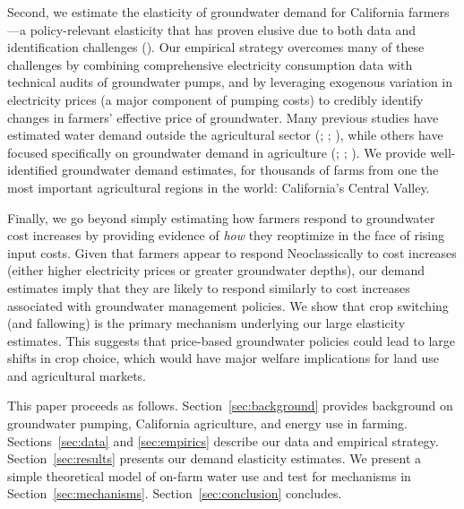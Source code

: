 Second, we estimate the elasticity of groundwater demand for California farmers---a policy-relevant elasticity that has proven elusive due to both data and identification challenges (\textcite{mieno2017}). Our empirical strategy overcomes many of these challenges by combining comprehensive electricity consumption data with technical audits of groundwater pumps, and by leveraging exogenous variation in electricity prices (a major component of pumping costs) to credibly identify changes in farmers' effective price of groundwater. 
Many previous studies have estimated water demand outside the agricultural sector (\textcite{hewitt1995}; \textcite{renwick2000}; \textcite{olmstead2007}), while others have focused specifically on groundwater demand in agriculture (\textcite{hendricks2012}; \textcite{pfeiffer2014}; \textcite{badiani2015}). We provide well-identified groundwater demand estimates, for thousands of farms from one the most important agricultural regions in the world: California's Central Valley.

Finally, we go beyond simply estimating how farmers respond to groundwater cost increases by providing evidence of \emph{how} they reoptimize in the face of rising input costs. Given that farmers appear to respond Neoclassically to cost increases (either higher electricity prices or greater groundwater depths), our demand estimates imply that they are likely to respond similarly to cost increases associated with groundwater management policies. We show that crop switching (and fallowing) is the primary mechanism underlying our large elasticity estimates. This suggests that price-based groundwater policies could lead to large shifts in crop choice, which would have major welfare implications for land use and agricultural markets. 





This paper proceeds as follows. Section~\ref{sec:background} provides background on groundwater pumping, California agriculture, and energy use in farming. Sections~\ref{sec:data} and \ref{sec:empirics} describe our data and empirical strategy. Section~\ref{sec:results} presents our demand elasticity estimates. We present a simple theoretical model of on-farm water use and test for mechanisms in Section~\ref{sec:mechanisms}. Section~\ref{sec:conclusion} concludes.
